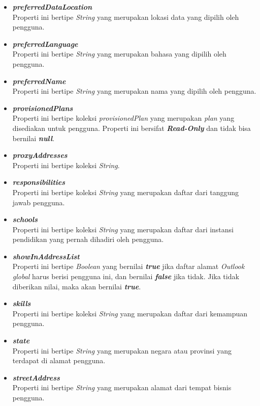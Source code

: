 \begin{itemize}
	\item \textbf{\textit{preferredDataLocation}}\\
	Properti ini bertipe \textit{String} yang merupakan lokasi data yang dipilih oleh pengguna.
	 \item \textbf{\textit{preferredLanguage}}\\
	Properti ini bertipe \textit{String} yang merupakan bahasa yang dipilih oleh pengguna.
	\item \textbf{\textit{preferredName}}\\
	Properti ini bertipe \textit{String} yang merupakan nama yang dipilih oleh pengguna.
	\item \textbf{\textit{provisionedPlans}}\\
	Properti ini bertipe koleksi \textit{provisionedPlan} yang merupakan \textit{plan} yang disediakan untuk pengguna. Properti ini bersifat \textbf{\textit{Read-Only}} dan tidak bisa bernilai \textbf{\textit{null}}.
	\item \textbf{\textit{proxyAddresses}}\\
	Properti ini bertipe koleksi \textit{String}.
	\item \textbf{\textit{responsibilities}}\\
	Properti ini bertipe koleksi \textit{String} yang merupakan daftar dari tanggung jawab pengguna.
	\item \textbf{\textit{schools}}\\
	Properti ini bertipe koleksi \textit{String} yang merupakan daftar dari instansi pendidikan yang pernah dihadiri oleh pengguna.
	\item \textbf{\textit{showInAddressList}}\\
	Properti ini bertipe \textit{Boolean} yang bernilai \textbf{\textit{true}} jika daftar alamat \textit{Outlook global} harus berisi pengguna ini, dan bernilai \textbf{\textit{false}} jika tidak. Jika tidak diberikan nilai, maka akan bernilai \textbf{\textit{true}}. 
	\item \textbf{\textit{skills}}\\
	Properti ini bertipe koleksi \textit{String} yang merupakan daftar dari kemampuan pengguna. 
	\item \textbf{\textit{state}}\\
	Properti ini bertipe \textit{String} yang merupakan negara atau provinsi yang terdapat di alamat pengguna. 
	\item \textbf{\textit{streetAddress}}\\
	Properti ini bertipe \textit{String} yang merupakan alamat dari tempat bisnis pengguna.

\end{itemize}
